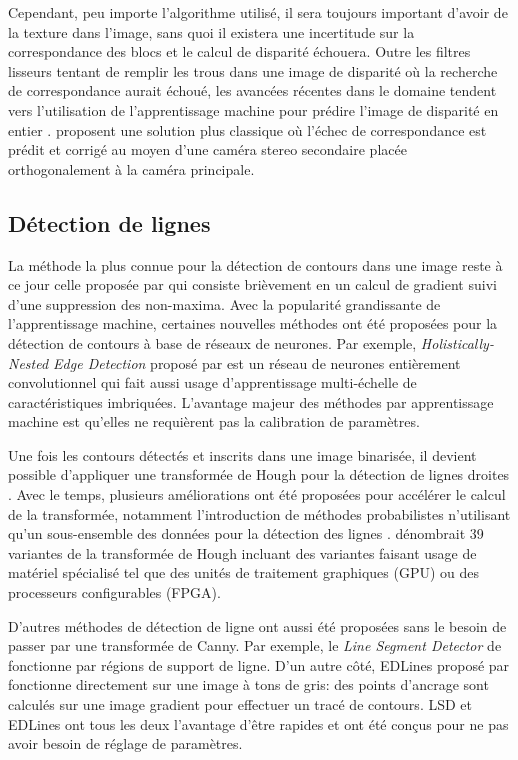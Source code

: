 Cependant, peu importe l'algorithme utilisé, il sera toujours important d'avoir de la texture dans l'image, sans quoi il existera une incertitude sur la correspondance des blocs et le calcul de disparité échouera. Outre les filtres lisseurs tentant de remplir les trous dans une image de disparité où la recherche de correspondance aurait échoué, les avancées récentes dans le domaine tendent vers l'utilisation de l'apprentissage machine pour prédire l'image de disparité en entier \citep{Kendall_2017_ICCV}. \cite{meier2017real} proposent une solution plus classique où l'échec de correspondance est prédit et corrigé au moyen d'une caméra stereo secondaire placée orthogonalement à la caméra principale.

\subsection{Détection de lignes}

La méthode la plus connue pour la détection de contours dans une image reste à ce jour celle proposée par \cite{Canny1986} qui consiste brièvement en un calcul de gradient suivi d'une suppression des non-maxima. Avec la popularité grandissante de l'apprentissage machine, certaines nouvelles méthodes ont été proposées pour la détection de contours à base de réseaux de neurones. Par exemple, \textit{Holistically-Nested Edge Detection} proposé par \citep{Xie2015} est un réseau de neurones entièrement convolutionnel qui fait aussi usage d'apprentissage multi-échelle de caractéristiques imbriquées. L'avantage majeur des méthodes par apprentissage machine est qu'elles ne requièrent pas la calibration de paramètres.

Une fois les contours détectés et inscrits dans une image binarisée, il devient possible d'appliquer une transformée de Hough pour la détection de lignes droites \citep{Duda1972}. Avec le temps, plusieurs améliorations ont été proposées pour accélérer le calcul de la transformée, notamment l'introduction de méthodes probabilistes n'utilisant qu'un sous-ensemble des données pour la détection des lignes \citep{Matas2000}. \cite{Herout2013} dénombrait 39 variantes de la transformée de Hough incluant des variantes faisant usage de matériel spécialisé tel que des unités de traitement graphiques (GPU) ou des processeurs configurables (FPGA).

D'autres méthodes de détection de ligne ont aussi été proposées sans le besoin de passer par une transformée de Canny. Par exemple, le \textit{Line Segment Detector} de \citep{Gioi2012lsd} fonctionne par régions de support de ligne. D'un autre côté, EDLines proposé par \citep{AKINLAR20111633} fonctionne directement sur une image à tons de gris: des points d'ancrage sont calculés sur une image gradient pour effectuer un tracé de contours. LSD et EDLines ont tous les deux l'avantage d'être rapides et ont été conçus pour ne pas avoir besoin de réglage de paramètres.

